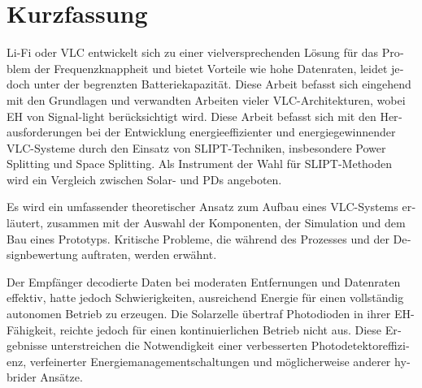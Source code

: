 \section*{Kurzfassung}
\begin{otherlanguage}{ngerman}
\ac{Li-Fi} oder \ac{VLC} entwickelt sich zu einer vielversprechenden Lösung für das Problem der Frequenzknappheit und bietet Vorteile wie hohe Datenraten, leidet jedoch unter der begrenzten Batteriekapazität. Diese Arbeit befasst sich eingehend mit den Grundlagen und verwandten Arbeiten vieler \ac{VLC}-Architekturen, wobei \ac{EH} von Signal-light berücksichtigt wird. Diese Arbeit befasst sich mit den Herausforderungen bei der Entwicklung energieeffizienter und energiegewinnender \ac{VLC}-Systeme durch den Einsatz von \ac{SLIPT}-Techniken, insbesondere Power Splitting und Space Splitting. Als Instrument der Wahl für \ac{SLIPT}-Methoden wird ein Vergleich zwischen Solar- und \ac{PD}s angeboten.

Es wird ein umfassender theoretischer Ansatz zum Aufbau eines \ac{VLC}-Systems erläutert, zusammen mit der Auswahl der Komponenten, der Simulation und dem Bau eines Prototyps. Kritische Probleme, die während des Prozesses und der Designbewertung auftraten, werden erwähnt.

Der Empfänger decodierte Daten bei moderaten Entfernungen und Datenraten effektiv, hatte jedoch Schwierigkeiten, ausreichend Energie für einen vollständig autonomen Betrieb zu erzeugen. Die Solarzelle übertraf Photodioden in ihrer \ac{EH}-Fähigkeit, reichte jedoch für einen kontinuierlichen Betrieb nicht aus. Diese Ergebnisse unterstreichen die Notwendigkeit einer verbesserten Photodetektoreffizienz, verfeinerter Energiemanagementschaltungen und möglicherweise anderer hybrider Ansätze.

\end{otherlanguage}
\vfill
